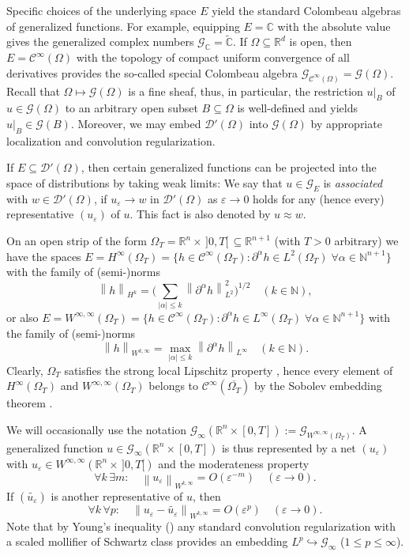 \documentclass[sumlimits,intlimits,namelimits%
]{amsart}
\newcommand{\Cinf}{\ensuremath{\mathcal{C}^\infty}}
\newcommand{\D}{\ensuremath{\mathcal{D}}}
\newcommand{\G}{\ensuremath{\mathcal{G}}}
\newcommand{\mb}[1]{\ensuremath{\mathbb{#1}}}
\newcommand{\N}{\mb{N}}
\newcommand{\R}{\mb{R}}
\newcommand{\C}{\mb{C}}
\renewcommand{\d}{\ensuremath{\partial}}
\theoremstyle{definition}
\newcommand{\norm}[2]{{\left\| #1 \right\|}_{#2}}
\newcommand{\al}{\alpha}
\newcommand{\eps}{\varepsilon}
\newcommand{\ovl}[1]{\overline{#1}}
\begin{document}
Specific choices of the underlying space $E$ yield the standard Colombeau algebras of generalized functions. For example, equipping $E=\C$ with the absolute value gives the generalized complex numbers $\G_{\C} = \widetilde{\C}$.  If $\Omega \subseteq \R^d$ is open, then $E=\Cinf(\Omega)$ with the topology of compact uniform convergence of all derivatives provides the so-called special Colombeau algebra $\G_{\Cinf(\Omega)}=\G(\Omega)$. Recall that $\Omega \mapsto \G(\Omega)$ is a fine sheaf, thus, in particular, the restriction $u|_B$ of $u\in\G(\Omega)$ to an arbitrary open subset $B \subseteq \Omega$ is well-defined and yields $u|_B \in \G(B)$. Moreover, we may embed $\D'(\Omega)$ into $\G(\Omega)$ by appropriate localization and convolution regularization. 

If $E \subseteq \D'(\Omega)$, then certain generalized functions can be projected into the space of distributions by taking  weak limits: We say that $u \in \G_E$ is \emph{associated} with $w \in \D'(\Omega)$, if $u_\eps \to w$ in $\D'(\Omega)$ as $\eps \to 0$ holds for any (hence every) representative $(u_\eps)$ of $u$. This fact is also denoted by $u \approx w$. 

On an open strip of the form $\Omega_T = \R^n \times\, ]0,T[ \,\subseteq \R^{n+1}$ (with $T > 0$ arbitrary) we have the spaces $E = H^\infty({\Omega_T}) = \{ h \in \Cinf(\Omega_T) : \d^\al h \in L^2(\Omega_T) \; \forall \al\in \N^{n+1}\}$ with the family of (semi-)norms 
$$
  \norm{h}{H^k} = \Big( \sum_{|\al| \leq k} 
    \norm{\d^\al h}{L^2}^2\Big)^{1/2}
   \quad (k\in \N), 
$$
or also   
$E = W^{\infty,\infty}({\Omega_T}) = \{ h \in \Cinf(\Omega_T) : \d^\al h \in L^\infty(\Omega_T) \; \forall \al\in \N^{n+1}\}$  with the family of (semi-)norms 
$$
  \norm{h}{W^{k,\infty}} = \max_{|\al| \leq k} \norm{\d^\al h}{L^\infty} \quad (k\in \N). 
$$
Clearly, $\Omega_T$  satisfies the strong local Lipschitz property \cite[Chapter IV, 4.6, p.\ 66]{Adams:75}, hence every element of $H^\infty(\Omega_T)$ and $W^{\infty,\infty}(\Omega_T)$ belongs to $\Cinf(\ovl{\Omega_T})$ by the Sobolev embedding theorem \cite[Chapter V, Theorem 5.4, Part II, p.\ 98]{Adams:75}.

We will occasionally use the notation  $\G_\infty (\R^n \times [0,T]) := \G_{W^{\infty,\infty}({\Omega_T})}$.
A generalized function $u \in \G_{\infty}(\R^n \times [0,T])$ is thus represented by a net $(u_\eps)$ with $u_\eps \in W^{\infty,\infty}(\R^n \times\, ]0,T[)$ and  the moderateness property
$$
    \forall k \, \exists m: \quad 
    \norm{u_{\eps}}{W^{k,\infty}} = O(\eps^{-m}) \quad (\eps \to 0).
$$
If $(\widetilde{u_{\eps}})$ is another representative of $u$, then 
$$
    \forall k \, \forall p: \quad 
    \norm{u_{\eps} - \widetilde{u_{\eps}}}{W^{k,\infty}} = O(\eps^{p}) 
    \quad (\eps \to 0).
$$
Note that by Young's inequality (\cite[Proposition 8.9.(a)]{Folland:99}) any standard convolution regularization with a scaled mollifier of Schwartz class provides an embedding  $L^p \hookrightarrow \G_{\infty}$ ($1 \leq p \leq \infty$).  
\end{document}
